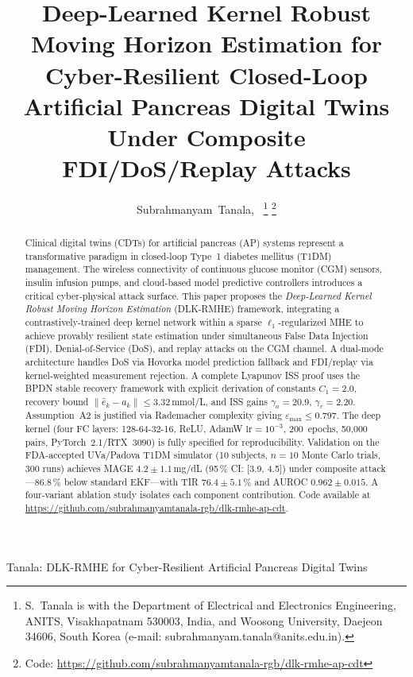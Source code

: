 \documentclass[journal,twoside]{IEEEtran}
\newcommand{\ehat}{\hat{e}}
\begin{document}
\title{Deep-Learned Kernel Robust Moving Horizon Estimation for
Cyber-Resilient Closed-Loop Artificial Pancreas Digital Twins
Under Composite FDI/DoS/Replay Attacks}

\author{Subrahmanyam~Tanala,~%
\thanks{S.~Tanala is with the Department of Electrical and Electronics Engineering,
ANITS, Visakhapatnam 530003, India, and Woosong University, Daejeon 34606,
South Korea (e-mail: subrahmanyam.tanala@anits.edu.in).}%
\thanks{Code: \url{https://github.com/subrahmanyamtanala-rgb/dlk-rmhe-ap-cdt}}}

%
{Tanala: DLK-RMHE for Cyber-Resilient Artificial Pancreas Digital Twins}

\maketitle

\begin{abstract}
Clinical digital twins (CDTs) for artificial pancreas (AP) systems represent a
transformative paradigm in closed-loop Type~1 diabetes mellitus (T1DM) management.
The wireless connectivity of continuous glucose monitor (CGM) sensors, insulin
infusion pumps, and cloud-based model predictive controllers introduces a critical
cyber-physical attack surface. This paper proposes the \emph{Deep-Learned Kernel
Robust Moving Horizon Estimation} (DLK-RMHE) framework, integrating a
contrastively-trained deep kernel network within a sparse $\ell_1$-regularized MHE
to achieve provably resilient state estimation under simultaneous False Data
Injection (FDI), Denial-of-Service (DoS), and replay attacks on the CGM channel.
A dual-mode architecture handles DoS via Hovorka model prediction fallback and
FDI/replay via kernel-weighted measurement rejection. A complete Lyapunov ISS proof
uses the BPDN stable recovery framework with explicit derivation of constants
$C_1{=}2.0$, recovery bound $\|\ehat_k{-}a_k\|\leq 3.32$\,mmol/L, and ISS gains
$\gamma_a{=}20.9$, $\gamma_\varepsilon{=}2.20$. Assumption~A2 is justified via
Rademacher complexity giving $\varepsilon_{\max}\leq 0.797$. The deep kernel (four
FC layers: 128-64-32-16, ReLU, AdamW $\mathrm{lr}{=}10^{-3}$, 200~epochs,
50,000 pairs, PyTorch~2.1/RTX~3090) is fully specified for reproducibility.
Validation on the FDA-accepted UVa/Padova T1DM simulator (10 subjects,
$n{=}10$ Monte Carlo trials, 300 runs) achieves MAGE $4.2{\pm}1.1$\,mg/dL
(95\,\% CI: [3.9, 4.5]) under composite attack---86.8\,\% below standard
EKF---with TIR $76.4{\pm}5.1$\,\% and AUROC $0.962{\pm}0.015$. A four-variant
ablation study isolates each component contribution.
Code available at \url{https://github.com/subrahmanyamtanala-rgb/dlk-rmhe-ap-cdt}.
\end{abstract}
\end{document}
